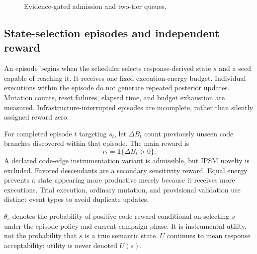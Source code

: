 \documentclass[final,5p,times,number]{elsarticle}
\begin{document}
\begin{figure}[!tbp]
\caption{Evidence-gated admission and two-tier queues.}
\label{fig:architecture}
\end{figure}

\subsection{State-selection episodes and independent reward}
An episode begins when the scheduler selects response-derived state $s$ and a seed capable of reaching it. It receives one fixed execution-energy budget. Individual executions within the episode do not generate repeated posterior updates. Mutation counts, reset failures, elapsed time, and budget exhaustion are measured. Infrastructure-interrupted episodes are incomplete, rather than silently assigned reward zero.

For completed episode $t$ targeting $s_t$, let $\Delta B_t$ count previously unseen code branches discovered within that episode. The main reward is
\begin{equation}
r_t=\mathbf{1}\{\Delta B_t>0\}.
\label{eq:reward}
\end{equation}
A declared code-edge instrumentation variant is admissible, but IPSM novelty is excluded. Favored descendants are a secondary sensitivity reward. Equal energy prevents a state appearing more productive merely because it receives more executions. Trial execution, ordinary mutation, and provisional validation use distinct event types to avoid duplicate updates.

$\theta_s$ denotes the probability of positive code reward conditional on selecting $s$ under the episode policy and current campaign phase. It is instrumental utility, not the probability that $s$ is a true semantic state. $U$ continues to mean response acceptability; utility is never denoted $U(s)$.
\end{document}
